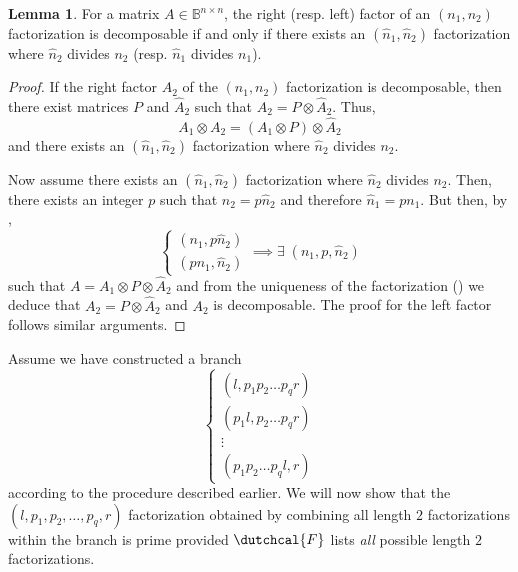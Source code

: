 \documentclass{article}
\numberwithin{equation}{section}
\theoremstyle{definition}
\newtheorem{lemma}[definition]{Lemma}
\begin{document}
\begin{lemma}
\label{lem: primality_1}
For a matrix $A \in \mathbb{B}^{n \times n}$, the right (resp. left) factor of an $(n_1,n_2)$ factorization is decomposable if and only if there exists an $(\hat{n}_1,\hat{n}_2)$ factorization where $\hat{n}_2$ divides $n_2$ (resp. $\hat{n}_1$ divides $n_1$). 
\end{lemma}
\begin{proof}
If the right factor $A_2$ of the $(n_1,n_2)$ factorization is decomposable, then there exist matrices $P$ and $\hat{A}_2$ such that $A_2 = P \otimes \hat{A}_2$. Thus,
\begin{equation*}
    A_1 \otimes A_2 = (A_1 \otimes P) \otimes \hat{A}_2
\end{equation*}
and there exists an $(\hat{n}_1,\hat{n}_2)$ factorization where $\hat{n}_2$ divides $n_2$. 

Now assume there exists an $(\hat{n}_1,\hat{n}_2)$ factorization where $\hat{n}_2$ divides $n_2$. Then, there exists an integer $p$ such that $n_2=p\hat{n}_2$ and therefore $\hat{n}_1=pn_1$. But then, by ,
\begin{equation*}
    \begin{cases}
        (n_1,p\hat{n}_2) \\
        (pn_1,\hat{n}_2)
    \end{cases}
    \implies \exists \; (n_1,p,\hat{n}_2)
\end{equation*}
such that $A=A_1 \otimes P \otimes \hat{A}_2$ and from the uniqueness of the factorization () we deduce that $A_2=P \otimes \hat{A}_2$ and $A_2$ is decomposable. The proof for the left factor follows similar arguments.
\end{proof}

Assume we have constructed a branch 
\begin{equation*}
    \begin{cases}
        (l, p_1p_2\dots p_q r) \\
        (p_1l, p_2\dots p_q r) \\
        \vdots \\
        (p_1 p_2 \dots p_q l, r)
    \end{cases}
\end{equation*}
according to the procedure described earlier. We will now show that the $(l,p_1,p_2,\dots,p_q,r)$ factorization obtained by combining all length $2$ factorizations within the branch is prime provided $\dutchcal{F}$ lists \emph{all} possible length $2$ factorizations.
\end{document}
